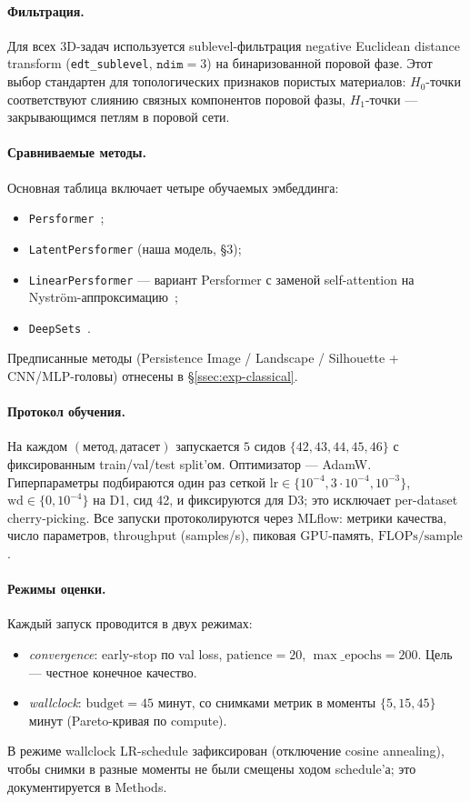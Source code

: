 \paragraph{Фильтрация.} Для всех 3D-задач используется sublevel-фильтрация negative Euclidean distance transform (\texttt{edt\_sublevel}, $\texttt{ndim}=3$) на бинаризованной поровой фазе. Этот выбор стандартен для топологических признаков пористых материалов: $H_0$-точки соответствуют слиянию связных компонентов поровой фазы, $H_1$-точки --- закрывающимся петлям в поровой сети.

\paragraph{Сравниваемые методы.} Основная таблица включает четыре обучаемых эмбеддинга:
\begin{itemize}
    \item \texttt{Persformer}~\cite{reinauerPersformerTransformerArchitecture2021};
    \item \texttt{LatentPersformer} (наша модель, §3);
    \item \texttt{LinearPersformer} --- вариант Persformer с заменой self-attention на Nystr{\"o}m-аппроксимацию~\cite{xiongNystromformer2021};
    \item \texttt{DeepSets}~\cite{zaheerDeepSets2017}.
\end{itemize}
Предписанные методы (Persistence Image / Landscape / Silhouette + CNN/MLP-головы) отнесены в §\ref{ssec:exp-classical}.

\paragraph{Протокол обучения.} На каждом $(\text{метод}, \text{датасет})$ запускается $5$ сидов $\{42, 43, 44, 45, 46\}$ с фиксированным train/val/test split'ом. Оптимизатор --- AdamW. Гиперпараметры подбираются один раз сеткой $\text{lr} \in \{10^{-4}, 3{\cdot}10^{-4}, 10^{-3}\}$, $\text{wd} \in \{0, 10^{-4}\}$ на D1, сид 42, и фиксируются для D3; это исключает per-dataset cherry-picking. Все запуски протоколируются через MLflow: метрики качества, число параметров, throughput (samples/s), пиковая GPU-память, $\text{FLOPs}/\text{sample}$.

\paragraph{Режимы оценки.} Каждый запуск проводится в двух режимах:
\begin{itemize}
    \item \emph{convergence}: early-stop по val loss, $\text{patience}=20$, $\max\_\text{epochs}=200$. Цель --- честное конечное качество.
    \item \emph{wallclock}: $\text{budget}=45$ минут, со снимками метрик в моменты $\{5, 15, 45\}$ минут (Pareto-кривая по compute).
\end{itemize}
В режиме wallclock LR-schedule зафиксирован (отключение cosine annealing), чтобы снимки в разные моменты не были смещены ходом schedule'а; это документируется в Methods.

